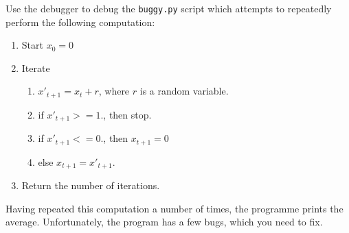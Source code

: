 \begin{exercise}
Use the debugger to debug the \texttt{buggy.py} script which attempts to
repeatedly perform the following computation:

\begin{enumerate}
\item Start $x_0 = 0$
\item Iterate

\begin{enumerate}
\item $x'_{t+1} = x_t + r$, where $r$ is a random variable.
\item if $x'_{t+1} >= 1.$, then stop.
\item if $x'_{t+1} <= 0.$, then $x_{t+1} = 0$
\item else $x_{t+1} = x'_{t+1}$.
\end{enumerate}
\item Return the number of iterations.
\end{enumerate}

Having repeated this computation a number of times, the programme prints the
average. Unfortunately, the program has a few bugs, which you need to fix.
\end{exercise}

